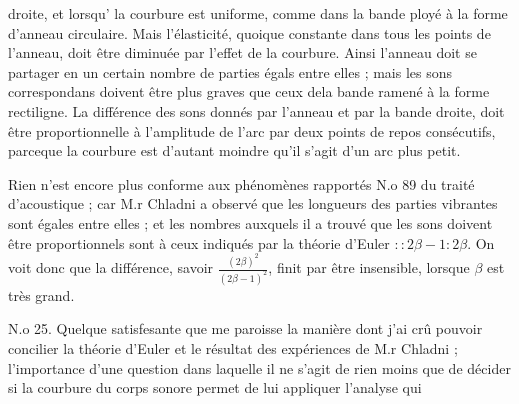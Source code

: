\documentclass[11pt,a4paper]{article}
\begin{document}



droite, et lorsqu' la courbure est uniforme, comme dans
la bande ployé à la forme d'anneau circulaire. Mais
l'élasticité, quoique constante dans tous les points de l'anneau, doit
être diminuée par l'effet de la courbure. Ainsi l'anneau doit se 
partager en un certain nombre de parties égals entre elles ; mais
les sons correspondans doivent être plus graves que ceux dela
bande ramené à la forme rectiligne. La différence des sons donnés
par l'anneau et par la bande droite, doit être proportionnelle
à l'amplitude de l'arc   par deux points de repos
consécutifs, parceque la courbure est d'autant moindre qu'il
s'agit d'un arc plus petit.

Rien n'est encore plus conforme aux phénomènes rapportés
N.o 89 du traité d'acoustique ; car M.r Chladni a observé
que les longueurs des parties vibrantes sont égales entre elles ;
et les nombres auxquels il a trouvé que les sons doivent
être proportionnels sont à ceux indiqués par la théorie
d'Euler $::2\beta-1:2\beta$. On voit donc que la différence, savoir
$\frac{(2\beta)^2}{(2\beta-1)^2}$, finit par être insensible, lorsque $\beta$ est très grand.

N.o 25. Quelque satisfesante que me paroisse la manière dont j'ai
crû pouvoir concilier la théorie d'Euler et le résultat des
expériences de M.r Chladni ; l'importance d'une question dans laquelle
il ne s'agit de rien moins que de décider si la courbure du
corps sonore permet  de lui appliquer  l'analyse qui
\end{document}
